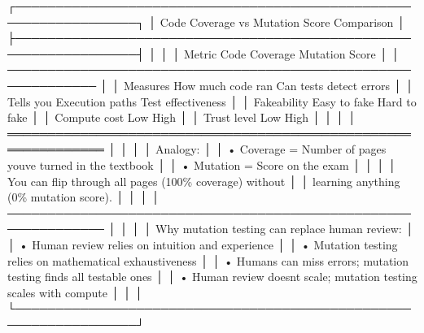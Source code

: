 \documentclass[
]{article}
\newenvironment{Shaded}{}{}
\newcommand{\NormalTok}[1]{#1}
\begin{document}
\begin{Shaded}
\begin{Highlighting}[]
\NormalTok{┌─────────────────────────────────────────────────────────────────┐}
\NormalTok{│             Code Coverage vs Mutation Score Comparison           │}
\NormalTok{├─────────────────────────────────────────────────────────────────┤}
\NormalTok{│                                                                  │}
\NormalTok{│  Metric           Code Coverage        Mutation Score           │}
\NormalTok{│  ─────────────────────────────────────────────────────────────  │}
\NormalTok{│  Measures         How much code ran    Can tests detect errors  │}
\NormalTok{│  Tells you        Execution paths      Test effectiveness       │}
\NormalTok{│  Fakeability      Easy to fake         Hard to fake             │}
\NormalTok{│  Compute cost     Low                  High                     │}
\NormalTok{│  Trust level      Low                  High                     │}
\NormalTok{│                                                                  │}
\NormalTok{│  ══════════════════════════════════════════════════════════════  │}
\NormalTok{│                                                                  │}
\NormalTok{│  Analogy:                                                       │}
\NormalTok{│  • Coverage = Number of pages you\textquotesingle{}ve turned in the textbook     │}
\NormalTok{│  • Mutation = Score on the exam                                 │}
\NormalTok{│                                                                  │}
\NormalTok{│  You can flip through all pages (100\% coverage) without         │}
\NormalTok{│  learning anything (0\% mutation score).                         │}
\NormalTok{│                                                                  │}
\NormalTok{│  ──────────────────────────────────────────────────────────────  │}
\NormalTok{│                                                                  │}
\NormalTok{│  Why mutation testing can replace human review:                 │}
\NormalTok{│  • Human review relies on intuition and experience              │}
\NormalTok{│  • Mutation testing relies on mathematical exhaustiveness       │}
\NormalTok{│  • Humans can miss errors; mutation testing finds all testable ones │}
\NormalTok{│  • Human review doesn\textquotesingle{}t scale; mutation testing scales with compute │}
\NormalTok{│                                                                  │}
\NormalTok{└─────────────────────────────────────────────────────────────────┘}
\end{Highlighting}
\end{Shaded}
\end{document}
